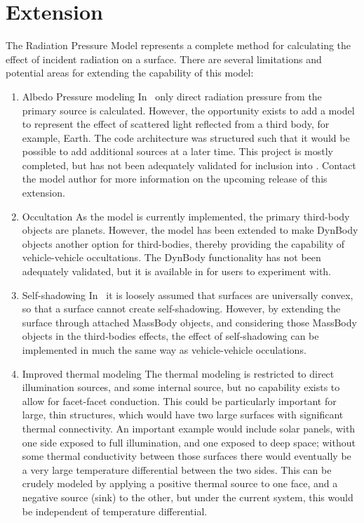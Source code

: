 %
%
%

 \section{Extension}
The Radiation Pressure Model represents a complete method for calculating the effect of incident radiation on a surface.  There are several limitations and potential areas for extending the capability of this model:

\begin{enumerate}
\item{Albedo Pressure modeling} \newline
In \JEODid\, only direct radiation pressure from the primary source is calculated.  However, the opportunity exists to add a model to represent the effect of scattered light reflected from a third body, for example, Earth.  The code architecture was structured such that it would be possible to add additional sources at a later time.  This project is mostly completed, but has not been adequately validated for inclusion into \JEODid.  Contact the model author for more information on the upcoming release of this extension.
\item{Occultation} \newline
As the model is currently implemented, the primary third-body objects are planets.  However, the model has been extended to make DynBody objects another option for third-bodies, thereby providing the capability of vehicle-vehicle occultations. The DynBody functionality has not been adequately validated, but it is available in \JEODid for users to experiment with.
\item{Self-shadowing} \newline
In \JEODid\, it is loosely assumed that surfaces are universally convex, so that a surface cannot create self-shadowing.  However, by extending the surface through attached MassBody objects, and considering those MassBody objects in the third-bodies effects, the effect of self-shadowing can be implemented in much the same way as vehicle-vehicle occulations.
\item{Improved thermal modeling} \newline
The thermal modeling is restricted to direct illumination sources, and some internal source, but no capability exists to allow for facet-facet conduction.  This could be particularly important for large, thin structures, which would have two large surfaces with significant thermal connectivity.  An important example would include solar panels, with one side exposed to full illumination, and one exposed to deep space; without some thermal conductivity between those surfaces there would eventually be a very large temperature differential between the two sides.  This can be crudely modeled by applying a positive thermal source to one face, and a negative source (sink) to the other, but under the current system, this would be independent of temperature differential.
\end{enumerate}
